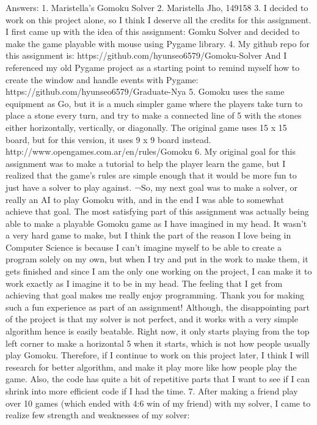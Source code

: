 Answers:
1.	Maristella’s Gomoku Solver
2.	Maristella Jho, 149158
3.	I decided to work on this project alone, so I think I deserve all the credits for this assignment. I first came up with the idea of this assignment: Gomku Solver and decided to make the game playable with mouse using Pygame library.
4.	My github repo for this assignment is: https://github.com/hyunseo6579/Gomoku-Solver
And I referenced my old Pygame project as a starting point to remind myself how to create the window and handle events with Pygame: https://github.com/hyunseo6579/Graduate-Nya
5.	Gomoku uses the same equipment as Go, but it is a much simpler game where the players take turn to place a stone every turn, and try to make a connected line of 5 with the stones either horizontally, vertically, or diagonally. The original game uses 15 x 15 board, but for this version, it uses 9 x 9 board instead.
http://www.opengames.com.ar/en/rules/Gomoku
6.	My original goal for this assignment was to make a tutorial to help the player learn the game, but I realized that the game’s rules are simple enough that it would be more fun to just have a solver to play against. ¬So, my next goal was to make a solver, or really an AI to play Gomoku with, and in the end I was able to somewhat achieve that goal. The most satisfying part of this assignment was actually being able to make a playable Gomoku game as I have imagined in my head. It wasn’t a very hard game to make, but I think the part of the reason I love being in Computer Science is because I can’t imagine myself to be able to create a program solely on my own, but when I try and put in the work to make them, it gets finished and since I am the only one working on the project, I can make it to work exactly as I imagine it to be in my head. The feeling that I get from achieving that goal makes me really enjoy programming. Thank you for making such a fun experience as part of an assignment! Although, the disappointing part of the project is that my solver is not perfect, and it works with a very simple algorithm hence is easily beatable. Right now, it only starts playing from the top left corner to make a horizontal 5 when it starts, which is not how people usually play Gomoku. Therefore, if I continue to work on this project later, I think I will research for better algorithm, and make it play more like how people play the game. Also, the code has quite a bit of repetitive parts that I want to see if I can shrink into more efficient code if I had the time.
7.	After making a friend play over 10 games (which ended with 4:6 win of my friend) with my solver, I came to realize few strength and weaknesses of my solver:
